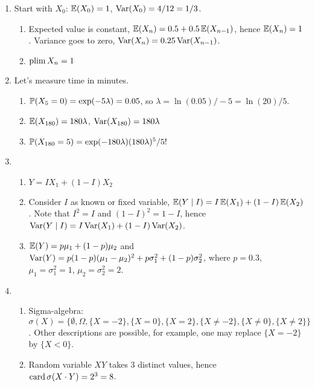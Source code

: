 \begin{enumerate}
    
    \item 
    Start with $X_0$: $\E(X_0) = 1$, $\Var(X_0) = 4/12 = 1/3$.

    \begin{enumerate}
      \item Expected value is constant, $\E(X_n) = 0.5 + 0.5 \E(X_{n-1})$, hence $\E(X_n) = 1$. 
      Variance goes to zero, $\Var(X_n) = 0.25 \Var(X_{n-1})$.
      \item $\plim X_n = 1$
    \end{enumerate}
    
    \item 
    Let's measure time in minutes. 
    \begin{enumerate}
      \item $\P(X_5 = 0) = \exp(-5 \lambda) = 0.05$, so $\lambda = \ln (0.05) / -5 = \ln(20) /5$.
      \item $\E(X_{180}) = 180 \lambda$, $\Var(X_{180}) = 180\lambda$
      \item $\P(X_{180} = 5) = \exp(-180 \lambda) (180\lambda)^5/5!$
    \end{enumerate}
  
    \item 
    \begin{enumerate}
      \item $Y = IX_1 + (1-I)X_2$
      \item Consider $I$ as known or fixed variable, $\E(Y \mid I) = I\E(X_1) + (1 - I)\E(X_2)$.
      Note that $I^2 = I$ and $(1-I)^2 = 1-I$, hence $\Var(Y \mid I) = I\Var(X_1) + (1-I)\Var(X_2)$.
      \item $\E(Y) = p \mu_1 + (1-p) \mu_2$ and $\Var(Y) = p(1-p)(\mu_1 - \mu_2)^2 + p\sigma^2_1 + (1-p)\sigma^2_2$,
      where $p = 0.3$, $\mu_1 = \sigma_1^2= 1$, $\mu_2 = \sigma_2^2 =2$.
    \end{enumerate}
  
    \item 
      \begin{enumerate}
       \item 
       Sigma-algebra: $\sigma(X) = \{\emptyset, \Omega, \{X=-2\},  \{X=0\},  \{X=2\},  \{X\neq -2\},  \{X\neq 0\},  \{X\neq 2\}\}$.
       Other descriptions are possible, for example, one may replace $\{X = -2\}$ by $\{X < 0\}$.
       \item Random variable $XY$ takes 3 distinct values, hence $\card \sigma(X \cdot Y) = 2^3 = 8$.
      \end{enumerate}
      
  \end{enumerate}
  


